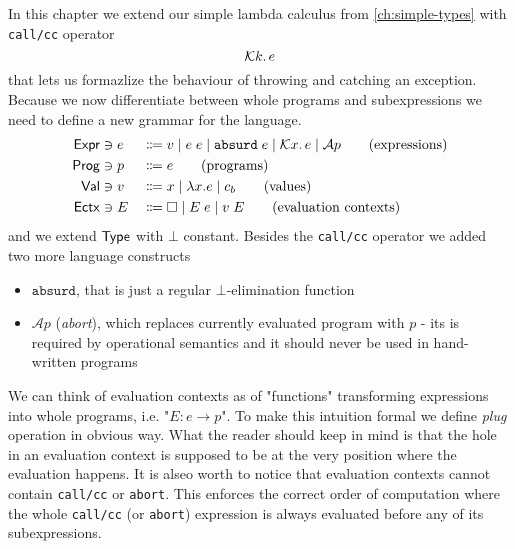 In this chapter we extend our simple lambda calculus from
\autoref{ch:simple-types} with \texttt{call/cc} operator
\[
  \mathcal{K} k\ldotp e
\]
that lets us formazlize the behaviour of throwing and catching an exception.
Because we now differentiate between whole programs and subexpressions
we need to define a new grammar for the language.
\begin{alignat*}{2}
  \mathsf{Expr} & \ni e && \Coloneqq v \mid e\;e \mid \texttt{absurd}\;e
    \mid \mathcal{K} x\ldotp e \mid \mathcal{A}p
    \tag{expressions} \\
  \mathsf{Prog} & \ni p && \Coloneqq e
    \tag{programs} \\
  \mathsf{Val} & \ni v && \Coloneqq x \mid \lambda x.e \mid c_b
    \tag{values} \\
  \mathsf{Ectx} & \ni E && \Coloneqq \square \mid E \; e \mid v \; E
    \tag{evaluation contexts}
\end{alignat*}
and we extend $\mathsf{Type}$ with $\bot$ constant.
Besides the \texttt{call/cc} operator we added two more language constructs
\begin{itemize}
  \item $\texttt{absurd}$, that is just a regular $\bot$-elimination
    function
  \item $\mathcal{A}p$ (\textit{abort}), which replaces currently evaluated
    program with $p$ - its is required by operational semantics and it
    should never be used in hand-written programs
\end{itemize}

We can think of evaluation contexts as of "functions" transforming
expressions into whole programs, i.e. "$E : e \rightarrow p$". To make this
intuition formal we define \textit{plug} operation in obvious way.
What the reader should keep in mind is that the hole in an evaluation context
is supposed to be at the very position where the evaluation happens.
It is alseo worth to notice that evaluation contexts cannot contain
\texttt{call/cc} or \texttt{abort}. This enforces the correct order of
computation where the whole \texttt{call/cc} (or \texttt{abort}) expression
is always evaluated before any of its subexpressions.

